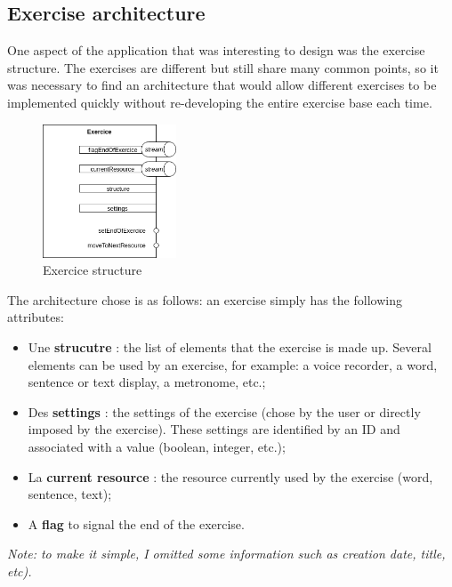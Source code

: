 \subsection{Exercise architecture}

One aspect of the application that was interesting to design was the exercise structure. The exercises are different but still share many common points, so it was necessary to find an architecture that would allow different exercises to be implemented quickly without re-developing the entire exercise base each time.

\begin{figure}[H]
  \includegraphics[width=150px]{content/imgs/exercice.png}
  \caption{Exercice structure}
  \label{fig:exercice}
\end{figure}

The architecture chose is as follows: an exercise simply has the following attributes:

\begin{itemize}
  \item Une \textbf{strucutre} : the list of elements that the exercise is made up. Several elements can be used by an exercise, for example: a voice recorder, a word, sentence or text display, a metronome, etc.;
  \item Des \textbf{settings} : the settings of the exercise (chose by the user or directly imposed by the exercise). These settings are identified by an ID and associated with a value (boolean, integer, etc.);
  \item La \textbf{current resource} : the resource currently used by the exercise (word, sentence, text);
  \item A \textbf{flag} to signal the end of the exercise.
\end{itemize}

\textit{Note: to make it simple, I omitted some information such as creation date, title, etc).}

